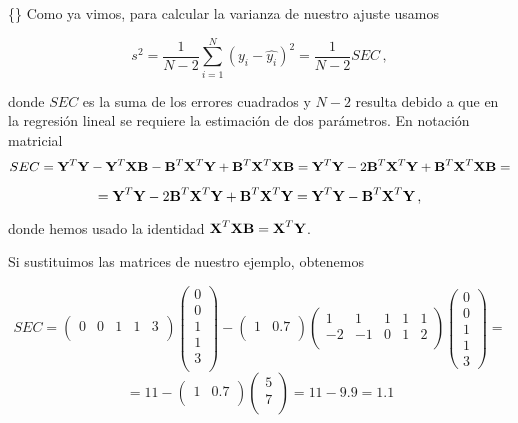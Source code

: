 \documentclass[
]{agujournal2019}
\begin{document}
\vspace{0.5cm}

\{\noindent\} Como ya vimos, para calcular la varianza de nuestro ajuste
usamos

\[s^2=\frac{1}{N-2}\sum\limits^N_{i=1}(y_i-\hat{y_i})^2=\frac{1}{N-2}SEC\,,\]

donde \(SEC\) es la suma de los errores cuadrados y \(N-2\) resulta
debido a que en la regresión lineal se requiere la estimación de dos
parámetros. En notación matricial
\[SEC={\textbf Y}^T{\textbf Y} - {\textbf Y}^T{\textbf X}{\textbf B}-{\textbf B}^T{\textbf X}^T{\textbf Y}+{\textbf B}^T
{\textbf X}^T{\textbf X}{\textbf B}=
{\textbf Y}^T{\textbf Y}-2{\textbf B}^T{\textbf X}^T{\textbf Y}+{\textbf B}^T{\textbf X}^T{\textbf X}{\textbf B}=\]

\[={\textbf Y}^T{\textbf Y}-2{\textbf B}^T{\textbf X}^T{\textbf Y}+{\textbf B}^T{\textbf X}^T{\textbf Y}=
{\textbf Y}^T{\textbf Y}-{\textbf B}^T{\textbf X}^T{\textbf Y}\,,\]

donde hemos usado la identidad
\({\textbf X}^T{\textbf X}{\textbf B}={\textbf X}^T{\textbf Y}\).

Si sustituimos las matrices de nuestro ejemplo, obtenemos

\[SEC=\left(\begin{array}{ccccc}
  0 & 0 & 1 & 1 & 3\\
        \end{array}\right)
      \left(\begin{array}{c}
  0 \\ 0 \\ 1 \\ 1 \\ 3\\
        \end{array}\right)-
    \left(\begin{array}{ccccc}
  1 & 0.7\\
        \end{array}\right)
    \left(\begin{array}{ccccc}
   1 &  1 & 1 & 1 & 1\\
  -2 & -1 & 0 & 1 & 2 \\
        \end{array}\right)
    \left(\begin{array}{c}
  0 \\ 0 \\ 1 \\ 1 \\ 3
        \end{array}\right)=\] \[=11-\left(\begin{array}{ccccc}
  1 & 0.7\\
        \end{array}\right)
    \left(\begin{array}{c}
        5 \\ 7\\
        \end{array}\right)=11-9.9=1.1\]
\end{document}
